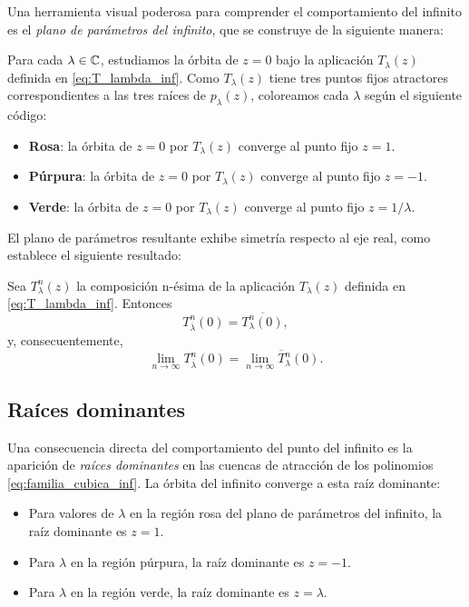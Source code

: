 Una herramienta visual poderosa para comprender el comportamiento del infinito es el \emph{plano de parámetros del infinito}, que se construye de la siguiente manera:

Para cada $\lambda\in\mathbb{C}$, estudiamos la órbita de $z=0$ bajo la aplicación $T_\lambda(z)$ definida en \eqref{eq:T_lambda_inf}. Como $T_\lambda(z)$ tiene tres puntos fijos atractores correspondientes a las tres raíces de $p_\lambda(z)$, coloreamos cada $\lambda$ según el siguiente código:

\begin{itemize}
\item \textbf{Rosa}: la órbita de $z=0$ por $T_\lambda(z)$ converge al punto fijo $z=1$.
\item \textbf{Púrpura}: la órbita de $z=0$ por $T_\lambda(z)$ converge al punto fijo $z=-1$.
\item \textbf{Verde}: la órbita de $z=0$ por $T_\lambda(z)$ converge al punto fijo $z=1/\lambda$.
\end{itemize}

El plano de parámetros resultante exhibe simetría respecto al eje real, como establece el siguiente resultado:

\begin{teorema}
Sea $T^n_\lambda(z)$ la composición n-ésima de la aplicación $T_\lambda(z)$ definida en \eqref{eq:T_lambda_inf}. Entonces
$$
T^n_{\overline{\lambda}}(0)=\overline{T^n_\lambda(0)},
$$
y, consecuentemente,
$$
\lim_{n\to\infty}T^n_{\overline{\lambda}}(0)=\overline{\lim_{n\to\infty}T^n_\lambda(0)}.
$$
\end{teorema}

\subsection{Raíces dominantes}

Una consecuencia directa del comportamiento del punto del infinito es la aparición de \emph{raíces dominantes} en las cuencas de atracción de los polinomios \eqref{eq:familia_cubica_inf}. La órbita del infinito converge a esta raíz dominante:

\begin{itemize}
\item Para valores de $\lambda$ en la región rosa del plano de parámetros del infinito, la raíz dominante es $z=1$.
\item Para $\lambda$ en la región púrpura, la raíz dominante es $z=-1$.
\item Para $\lambda$ en la región verde, la raíz dominante es $z=\lambda$.
\end{itemize}

